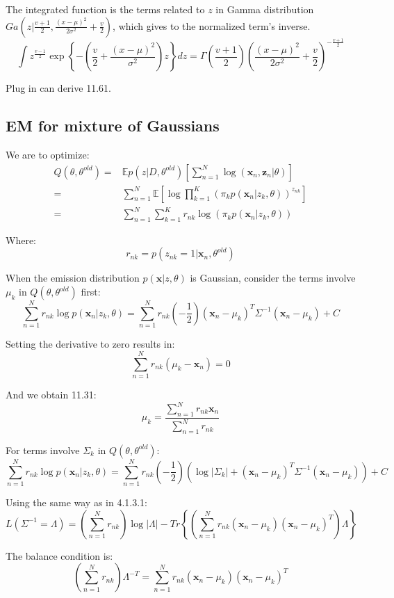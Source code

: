 \documentclass[UTF8]{ctexart}
\begin{document}
The integrated function is the terms related to $z$ in Gamma distribution $Ga(z|\frac{v+1}{2},\frac{(x-\mu)^{2}}{2\sigma^{2}}+\frac{v}{2})$, which gives to the normalized term's inverse.
$$\int z^{\frac{v-1}{2}}\exp\left\{ -(\frac{v}{2}+\frac{(x-\mu)^{2}}{\sigma^{2}})z \right\} dz = \Gamma(\frac{v+1}{2})(\frac{(x-\mu)^{2}}{2\sigma^{2}}+\frac{v}{2})^{-\frac{v+1}{2}}$$

Plug in can derive 11.61.

\subsection{EM for mixture of Gaussians}
We are to optimize:
\begin{align}
Q(\theta,\theta^{old})=&\mathbb{E}p(z|D,\theta^{old})[\sum_{n=1}^{N}\log (\textbf{x}_{n},\textbf{z}_{n}|\theta)]\nonumber \\
=&\sum_{n=1}^{N}\mathbb{E}[\log \prod_{k=1}^{K}(\pi_{k}p(\textbf{x}_{n}|z_{k},\theta))^{z_{nk}}]\nonumber \\
=&\sum_{n=1}^{N}\sum_{k=1}^{K}r_{nk}\log (\pi_{k}p(\textbf{x}_{n}|z_{k},\theta))\nonumber 
\end{align}

Where:
$$r_{nk}=p(z_{nk}=1|\textbf{x}_{n},\theta^{old})$$

When the emission distribution $p(\textbf{x}|z,\theta)$ is Gaussian, consider the terms involve$\mu_{k}$ in $Q(\theta,\theta^{old})$ first:
$$\sum_{n=1}^{N}r_{nk} \log p(\textbf{x}_{n}|z_{k},\theta) = \sum_{n=1}^{N} r_{nk} (-\frac{1}{2})(\textbf{x}_{n}-\mu_{k})^{T}\Sigma^{-1}(\textbf{x}_{n}-\mu_{k}) + C$$

Setting the derivative to zero results in:
$$\sum_{n=1}^{N}r_{nk}(\mu_{k}-\textbf{x}_{n})=0$$

And we obtain 11.31:
$$\mu_{k} =\frac{\sum_{n=1}^{N}r_{nk}\textbf{x}_{n}}{\sum_{n=1}^{N}r_{nk}}$$

For terms involve $\Sigma_{k}$ in $Q(\theta,\theta^{old})$:
$$\sum_{n=1}^{N}r_{nk}\log p(\textbf{x}_{n}|z_{k},\theta) = \sum_{n=1}^{N}r_{nk} (-\frac{1}{2})(\log |\Sigma_{k}|+(\textbf{x}_{n}-\mu_{k})^{T}\Sigma^{-1}(\textbf{x}_{n}-\mu_{k})) + C$$

Using the same way as in 4.1.3.1:
$$L(\Sigma^{-1}=\Lambda)=(\sum_{n=1}^{N}r_{nk})\log |\Lambda|-Tr\left\{ (\sum_{n=1}^{N}r_{nk}(\textbf{x}_{n}-\mu_{k})(\textbf{x}_{n}-\mu_{k})^{T}) \Lambda \right\}$$

The balance condition is:
$$(\sum_{n=1}^{N}r_{nk})\Lambda^{-T}=\sum_{n=1}^{N}r_{nk}(\textbf{x}_{n}-\mu_{k})(\textbf{x}_{n}-\mu_{k})^{T}$$
\end{document}
